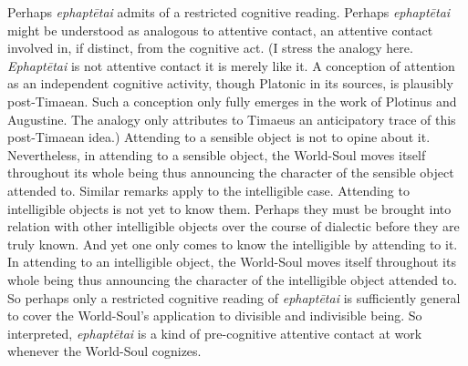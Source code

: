 Perhaps \emph{ephaptētai} admits of a restricted cognitive reading. Perhaps \emph{ephaptētai} might be understood as analogous to attentive contact, an attentive contact involved in, if distinct, from the cognitive act. (I stress the analogy here. \emph{Ephaptētai} is not attentive contact it is merely like it. A conception of attention as an independent cognitive activity, though Platonic in its sources, is plausibly post-Timaean. Such a conception only fully emerges in the work of Plotinus and Augustine. The analogy only attributes to Timaeus an anticipatory trace of this post-Timaean idea.) Attending to a sensible object is not to opine about it. Nevertheless, in attending to a sensible object, the World-Soul moves itself throughout its whole being thus announcing the character of the sensible object attended to. Similar remarks apply to the intelligible case. Attending to intelligible objects is not yet to know them. Perhaps they must be brought into relation with other intelligible objects over the course of dialectic before they are truly known. And yet one only comes to know the intelligible by attending to it. In attending to an intelligible object, the World-Soul moves itself throughout its whole being thus announcing the character of the intelligible object attended to. So perhaps only a restricted cognitive reading of \emph{ephaptētai} is sufficiently general to cover the World-Soul's application to divisible and indivisible being. So interpreted, \emph{ephaptētai} is a kind of pre-cognitive attentive contact at work whenever the World-Soul cognizes.

